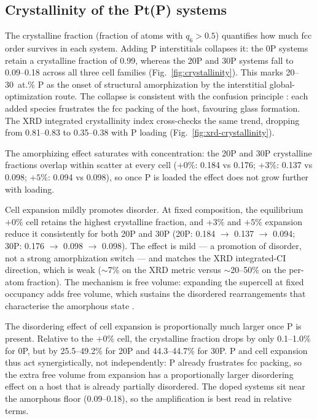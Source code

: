 \subsection{Crystallinity of the Pt(P) systems}\label{sec:results-crystallinity}

The crystalline fraction (fraction of atoms with $q_6 > 0.5$)
quantifies how much fcc order survives in each system. Adding P interstitials
collapses it: the 0P systems retain a crystalline fraction of 0.99,
whereas the 20P and 30P systems fall to 0.09--0.18 across all three cell
families (Fig.~\ref{fig:crystallinity}). This marks 20--30~at.\% P as the
onset of structural amorphization by the interstitial global-optimization
route. The collapse is consistent with the confusion principle
\cite{greer1993}: each added species frustrates the fcc packing of the host,
favouring glass formation. The XRD integrated crystallinity index
cross-checks the same trend, dropping from 0.81--0.83 to 0.35--0.38 with P
loading (Fig.~\ref{fig:xrd-crystallinity}).

The amorphizing effect saturates with concentration: the 20P and 30P
crystalline fractions overlap within scatter at every cell ($+0\%$: 0.184 vs
0.176; $+3\%$: 0.137 vs 0.098; $+5\%$: 0.094 vs 0.098), so once P is loaded
the effect does not grow further with loading.

Cell expansion mildly promotes disorder. At fixed composition, the
equilibrium $+0\%$ cell retains the highest crystalline fraction, and $+3\%$
and $+5\%$ expansion reduce it consistently for both 20P and 30P (20P:
0.184 $\to$ 0.137 $\to$ 0.094; 30P: 0.176 $\to$ 0.098 $\to$ 0.098). The
effect is mild --- a promotion of disorder, not a strong amorphization switch
--- and matches the XRD integrated-CI direction, which is weak ($\sim$7\% on
the XRD metric versus $\sim$20--50\% on the per-atom fraction). The mechanism
is free volume: expanding the supercell at fixed occupancy adds free volume,
which sustains the disordered rearrangements that characterise the amorphous
state \cite{yang2025}.

The disordering effect of cell expansion is proportionally much larger once
P is present. Relative to the $+0\%$ cell, the crystalline fraction drops by
only 0.1--1.0\% for 0P, but by 25.5--49.2\% for 20P and 44.3--44.7\% for 30P.
P and cell expansion thus act synergistically, not independently: P already
frustrates fcc packing, so the extra free volume from expansion has a
proportionally larger disordering effect on a host that is already partially
disordered. The doped systems sit near the amorphous floor (0.09--0.18), so
the amplification is best read in relative terms.

